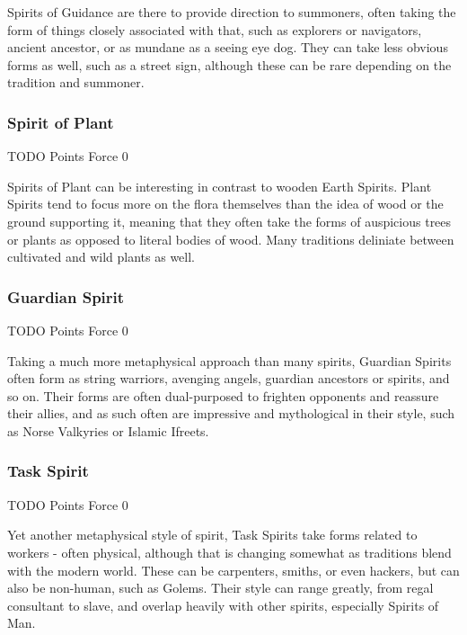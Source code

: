 \begin{multicols*}{3}
	Spirits of Guidance are there to provide direction to summoners, often taking the form of things closely associated with that, such as explorers or navigators, ancient ancestor, or as mundane as a seeing eye dog. They can take less obvious forms as well, such as a street sign, although these can be rare depending on the tradition and summoner.
	
	\subsubsection{Spirit of Plant}
	\begin{flushright}
		TODO Points Force 0
	\end{flushright}
	
	Spirits of Plant can be interesting in contrast to wooden Earth Spirits. Plant Spirits tend to focus more on the flora themselves than the idea of wood or the ground supporting it, meaning that they often take the forms of auspicious trees or plants as opposed to literal bodies of wood. Many traditions deliniate between cultivated and wild plants as well.
	
	\subsubsection{Guardian Spirit}
	\begin{flushright}
		TODO Points Force 0
	\end{flushright}
	
	Taking a much more metaphysical approach than many spirits, Guardian Spirits often form as string warriors, avenging angels, guardian ancestors or spirits, and so on. Their forms are often dual-purposed to frighten opponents and reassure their allies, and as such often are impressive and mythological in their style, such as Norse Valkyries or Islamic Ifreets.
	
	\subsubsection{Task Spirit}
	\begin{flushright}
		TODO Points Force 0
	\end{flushright}
	
	Yet another metaphysical style of spirit, Task Spirits take forms related to workers - often physical, although that is changing somewhat as traditions blend with the modern world. These can be carpenters, smiths, or even hackers, but can also be non-human, such as Golems. Their style can range greatly, from regal consultant to slave, and overlap heavily with other spirits, especially Spirits of Man.
	
\end{multicols*}